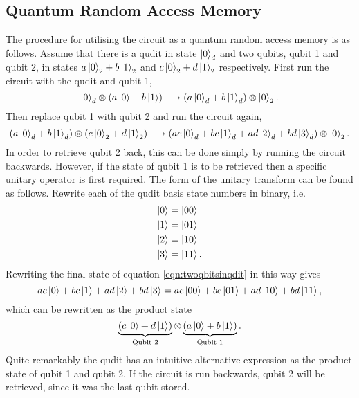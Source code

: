 \subsection{Quantum Random Access Memory}
\label{subsection:qram}
The procedure for utilising the circuit as a quantum random access memory is as follows.
Assume that there is a qudit in state $\ket{0}_d$ and two qubits, qubit 1 and qubit 2, in states $a\ket{0}_2 + b\ket{1}_2$ and $c\ket{0}_2 + d\ket{1}_2$ respectively.
First run the circuit with the qudit and qubit 1,
\begin{equation}\label{eqn:single_qbit_store}
    \ket{0}_d \otimes \left(a\ket{0} + b\ket{1}\right) \longrightarrow \left(a\ket{0}_d + b\ket{1}_d\right) \otimes \ket{0}_2.
\end{equation}
Then replace qubit 1 with qubit 2 and run the circuit again,
\begin{equation}
    \left(a\ket{0}_d + b\ket{1}_d\right) \otimes \left(c\ket{0}_2 + d\ket{1}_2 \right) \longrightarrow \left(ac\ket{0}_d + bc\ket{1}_d + ad\ket{2}_d + bd\ket{3}_d \right)\otimes\ket{0}_2.
    \label{eqn:twoqbitsinqdit}
\end{equation}
In order to retrieve qubit 2 back, this can be done simply by running the circuit backwards.
However, if the state of qubit 1 is to be retrieved then a specific unitary operator is first required. The form of the unitary transform can be found as follows.
Rewrite each of the qudit basis state numbers in binary, i.e.
\begin{align}
    \ket{0} &= \ket{00}\\
    \ket{1} &= \ket{01}\\
    \ket{2} &= \ket{10}\\
    \ket{3} &= \ket{11}.
\end{align}
Rewriting the final state of equation \ref{eqn:twoqbitsinqdit} in this way gives
\begin{equation}
    ac\ket{0} + bc\ket{1} + ad\ket{2} + bd\ket{3} = ac\ket{00} + bc\ket{01} + ad\ket{10} + bd\ket{11},
    \label{eqn:binaryexpression}
\end{equation}
which can be rewritten as the product state
\begin{equation}
    \underbrace{\left(c\ket{0} + d\ket{1}\right)}_{\text{Qubit 2}} \otimes \underbrace{\left(a\ket{0} + b\ket{1}\right)}_{\text{Qubit 1}}.
\end{equation}
Quite remarkably the qudit has an intuitive alternative expression as the product state of qubit 1 and qubit 2.
If the circuit is run backwards, qubit 2 will be retrieved, since it was the last qubit stored.
